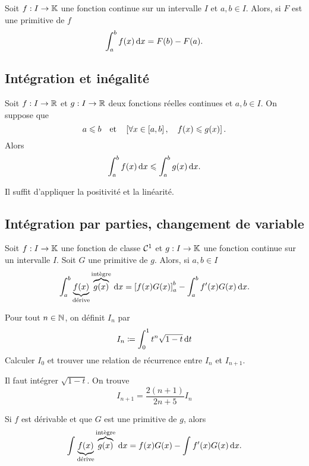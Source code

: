 \documentclass{magnolia}
\begin{document}
\begin{theoreme}[utile=3, nom=Théorème fondamental de l'analyse]
  Soit $f:I\to\mathbb{K}$ une fonction continue sur un intervalle $I$ et $a,b\in I$. Alors, si
  $F$ est une primitive de $f$
  \[\int_{a}^{b} f(x)\,\text{d}x=F(b)-F(a).\]
\end{theoreme}

\subsection{Intégration et inégalité}

\begin{proposition}[utile=3]
Soit $f:I\to\mathbb{R}$ et $g:I\to\mathbb{R}$ deux fonctions réelles continues et $a,b\in I$. On suppose que
\[a\leqslant b \quad\text{et}\quad \left[\forall x\in\left[a,b\right] ,\quad f(x)\leqslant g(x)\right].\]
Alors
\[\int_{a}^{b} f(x)\,\text{d}x\leqslant\int_{a}^{b} g(x)\,\text{d}x.\]
\end{proposition}

\begin{preuve}
Il suffit d'appliquer la positivité et la linéarité.
\end{preuve}


\subsection{Intégration par parties, changement de variable}

\begin{proposition}[utile=3, nom=Intégration par parties]
Soit $f:I\to\mathbb{K}$ une fonction de classe $\mathcal{C}^{1}$ et $g:I\to\mathbb{K}$ une fonction
continue sur un intervalle $I$. Soit $G$ une primitive de $g$. Alors, si $a,b\in I$
\[\int_{a}^{b} \underbrace{f(x)}_{\text{d\'erive}} \overbrace{g(x)}^{\text{int\`egre}}\,\text{d}x=\left[ f(x)G(x) \right]_{a}^{b}-
  \int_{a}^{b} f'(x)G(x)\,\text{d}x.\]
\end{proposition}

\begin{exoUnique}
\exo Pour tout $n\in\mathbb{N}$, on définit $I_n$ par
  \[I_n\coloneqq\int_{0}^{1} t^n\sqrt{1-t}\,\text{d}t\]
  Calculer $I_0$ et trouver une relation de récurrence entre $I_n$ et $I_{n+1}$.
  \begin{sol}
  Il faut intégrer $\sqrt{1-t}$. On trouve
  \[I_{n+1}=\frac{2(n+1)}{2n+5}I_n\]
  \end{sol}
\end{exoUnique}

\begin{remarqueUnique}
\remarque Si $f$ est dérivable et que $G$ est une primitive de $g$, alors
  \[\int_{}^{} \underbrace{f(x)}_{\text{d\'erive}} \overbrace{g(x)}^{\text{int\`egre}}\,\text{d}x=f(x)G(x)-\int_{}^{} f'(x)G(x)\,\text{d}x.\]
\end{remarqueUnique}
\end{document}
